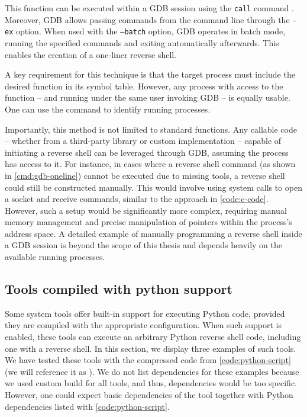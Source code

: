 This function can be executed within a GDB session using the \texttt{call} command \cite{gdb-man}. Moreover, GDB allows passing commands from the command line through the \texttt{-ex} option. When used with the \texttt{--batch} option, GDB operates in batch mode, running the specified commands and exiting automatically afterwards. This enables the creation of a one-liner reverse shell.


A key requirement for this technique is that the target process must include the desired function in its symbol table. However, any process with access to the function -- and running under the same user invoking GDB -- is equally usable. One can use the  command to identify running processes.

Importantly, this method is not limited to standard functions. Any callable code -- whether from a third-party library or custom implementation -- capable of initiating a reverse shell can be leveraged through GDB, assuming the process has access to it. For instance, in cases where a reverse shell command (as shown in \cref{cmd:gdb-oneline}) cannot be executed due to missing tools, a reverse shell could still be constructed manually. This would involve using system calls to open a socket and receive commands, similar to the approach in \cref{code:c-code}. However, such a setup would be significantly more complex, requiring manual memory management and precise manipulation of pointers within the process's address space. A detailed example of manually programming a reverse shell inside a GDB session is beyond the scope of this thesis and depends heavily on the available running processes.


\subsection{Tools compiled with python support}
\label{sec:compiled-with-python}

Some system tools offer built-in support for executing Python code, provided they are compiled with the appropriate configuration. When such support is enabled, these tools can execute an arbitrary Python reverse shell code, including one with a reverse shell. In this section, we display three examples of such tools. We have tested these tools with the compressed code from \cref{code:python-script} (we will reference it as \script). We do not list dependencies for these examples because we used custom build for all tools, and thus, dependencies would be too specific. However, one could expect basic dependencies of the tool together with Python dependencies listed with \cref{code:python-script}.


